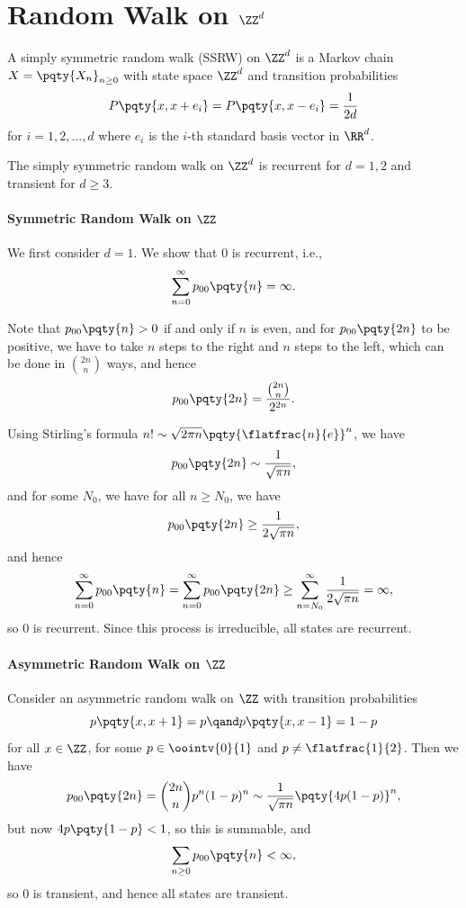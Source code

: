 \section{Random Walk on \(\ZZ^d\)}

\begin{definition}
    A simply symmetric random walk (SSRW) on \(\ZZ^d\) is a Markov chain \(X = \pqty{X_n}_{n \geq 0}\) with state space \(\ZZ^d\) and transition probabilities
    \[
        P\pqty{x, x + e_i} = P\pqty{x, x - e_i} = \frac{1}{2d}
    \]
    for \(i = 1, 2, \ldots, d\) where \(e_i\) is the \(i\)-th standard basis vector in \(\RR^d\).
\end{definition}

\begin{theorem}
    \label{thm:ssrw-recurrence-transience}%
    The simply symmetric random walk on \(\ZZ^d\) is recurrent for \(d = 1, 2\) and transient for \(d \geq 3\).
\end{theorem}

\paragraph{Symmetric Random Walk on \(\ZZ\)} We first consider \(d = 1\). We show that \(0\) is recurrent, i.e.,
\[
    \sum_{n = 0}^{\infty} p_{00}\pqty{n} = \infty.
\]

Note that \(p_{00}\pqty{n} > 0\) if and only if \(n\) is even, and for \(p_{00} \pqty{2n}\) to be positive, we have to take \(n\) steps to the right and \(n\) steps to the left, which can be done in \(\binom{2n}{n}\) ways, and hence
\[
    p_{00}\pqty{2n} = \frac{\binom{2n}{n}}{2^{2n}}.
\]

Using Stirling's formula \(n! \sim \sqrt{2 \pi n} \pqty{\flatfrac{n}{e}}^n\), we have
\[
    p_{00} \pqty{2n} \sim \frac{1}{\sqrt{\pi n}},
\]
and for some \(N_0\), we have for all \(n \geq N_0\), we have
\[
    p_{00} \pqty{2n} \geq \frac{1}{2\sqrt{\pi n}},
\]
and hence
\[
    \sum_{n = 0}^{\infty} p_{00}\pqty{n} = \sum_{n = 0}^{\infty} p_{00} \pqty{2n} \geq \sum_{n = N_0}^{\infty} \frac{1}{2\sqrt{\pi n}} = \infty,
\]
so \(0\) is recurrent. Since this process is irreducible, all states are recurrent.

\paragraph{Asymmetric Random Walk on \(\ZZ\)} Consider an asymmetric random walk on \(\ZZ\) with transition probabilities
\[
    p\pqty{x, x + 1} = p \qand p \pqty{x, x - 1} = 1 - p
\]
for all \(x \in \ZZ\), for some \(p \in \oointv{0}{1}\) and \(p \neq \flatfrac{1}{2}\). Then we have
\[
    p_{00}\pqty{2n} = \binom{2n}{n} p^n (1 - p)^n \sim \frac{1}{\sqrt{\pi n}} \pqty{4 p (1 - p)}^n,
\]
but now \(4 p \pqty{1 - p} < 1\), so this is summable, and
\[
    \sum_{n \geq 0} p_{00}\pqty{n} < \infty,
\] 
so \(0\) is transient, and hence all states are transient.

